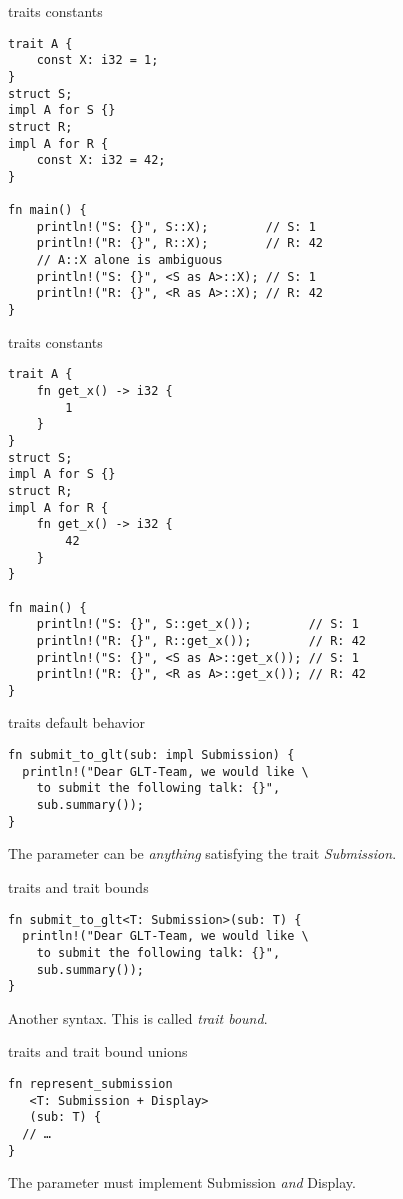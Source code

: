 \documentclass{beamer}
\begin{document}
\begin{frame}[fragile]{traits constants}
  \begin{verbatim}
trait A {
    const X: i32 = 1;
}
struct S;
impl A for S {}
struct R;
impl A for R {
    const X: i32 = 42;
}

fn main() {
    println!("S: {}", S::X);        // S: 1
    println!("R: {}", R::X);        // R: 42
    // A::X alone is ambiguous
    println!("S: {}", <S as A>::X); // S: 1
    println!("R: {}", <R as A>::X); // R: 42
}
  \end{verbatim}
\end{frame}

\begin{frame}[fragile]{traits constants}
  \begin{verbatim}
trait A {
    fn get_x() -> i32 {
        1
    }
}
struct S;
impl A for S {}
struct R;
impl A for R {
    fn get_x() -> i32 {
        42
    }
}

fn main() {
    println!("S: {}", S::get_x());        // S: 1
    println!("R: {}", R::get_x());        // R: 42
    println!("S: {}", <S as A>::get_x()); // S: 1
    println!("R: {}", <R as A>::get_x()); // R: 42
}
  \end{verbatim}
\end{frame}

\begin{frame}[fragile]{traits default behavior}
  \begin{verbatim}
fn submit_to_glt(sub: impl Submission) {
  println!("Dear GLT-Team, we would like \
    to submit the following talk: {}",
    sub.summary());
}
  \end{verbatim}

  The parameter can be \emph{anything} satisfying the trait \emph{Submission}.
\end{frame}

\begin{frame}[fragile]{traits and trait bounds}
  \begin{verbatim}
fn submit_to_glt<T: Submission>(sub: T) {
  println!("Dear GLT-Team, we would like \
    to submit the following talk: {}",
    sub.summary());
}
  \end{verbatim}

  Another syntax.
  This is called \emph{trait bound}.
\end{frame}

\begin{frame}[fragile]{traits and trait bound unions}
  \begin{verbatim}
fn represent_submission
   <T: Submission + Display>
   (sub: T) {
  // …
}
  \end{verbatim}

  The parameter must implement Submission \emph{and} Display.
\end{frame}
\end{document}
